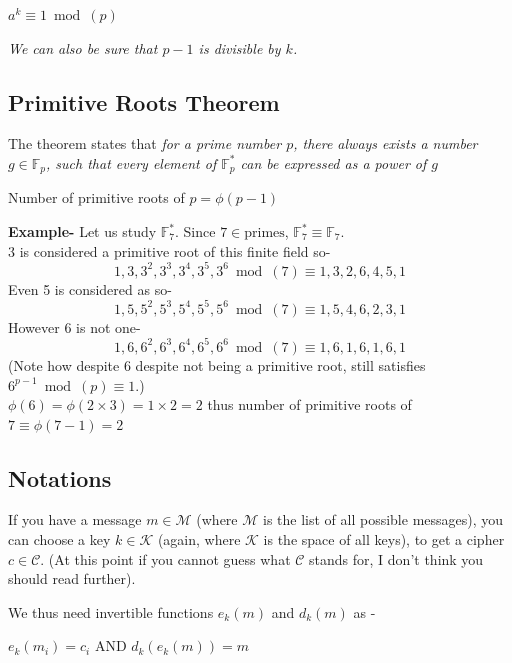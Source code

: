 	 	 \par 
	 	\centering \(a^k\equiv 1 \bmod(p)\) \par 
	 	\raggedright \em We can also be sure that \(p-1\) is divisible by \(k\). 
		 \subsection{Primitive Roots Theorem}\label{subsec:primitive}
		 The theorem states that \emph{for a prime number $p$, there always exists a number \(g \in \mathbb{F}_p\), such that every element of \(\mathbb{F}_p^{*}\) can be expressed as a power of $g$ } \par
		 Number of primitive roots of \(p= \phi(p-1)\)
		 \begin{tcolorbox}
		 	\textbf{Example-} Let us study \(\mathbb{F}_7^*\). Since \(7 \in \text{primes}\), \(\mathbb{F}_7^* \equiv \mathbb{F}_7\). \\
		 	3 is considered a primitive root of this finite field so-
		 	\[1, 3, 3^2, 3^3, 3^4, 3^5, 3^6 \bmod(7) \equiv 1, 3, 2, 6, 4, 5, 1\]
		 	Even 5 is considered as so-
		 	\[1,5,5^2,5^3,5^4,5^5,5^6 \bmod(7)\equiv 1,5,4, 6, 2, 3, 1\]
		 	However 6 is not one-\label{example:six}
		 	\[1,6,6^2,6^3,6^4,6^5,6^6 \bmod(7) \equiv 1, 6, 1, 6, 1, 6,1\]
		 	(Note how despite 6 despite not being a primitive root, still satisfies \(6^{p-1} \bmod(p) \equiv 1\).)\\

		 	\(\phi(6)=\phi(2\times3)=1\times 2=2\) thus number of primitive roots of \(7 \equiv \phi(7-1) = 2\) 
		 \end{tcolorbox}

		\subsection{Notations}
			If you have a message \(m \in \mathcal{M} \) (where \(\mathcal{M}\) is the list of all possible messages), you can choose a key \(k \in \mathcal{K}\) (again, where \(\mathcal{K}\) is the space of all keys), to get a cipher \(c \in \mathcal{C}\). (At this point if you cannot guess what \(\mathcal{C}\) stands for, I don't think you should read further).\par
			We thus need invertible functions \(e_k(m)\) and \(d_k(m)\) as -\par
			\centering \(e_k(m_i)= c_i\) AND \(d_k(e_k(m))=m\) \par
			\raggedright

